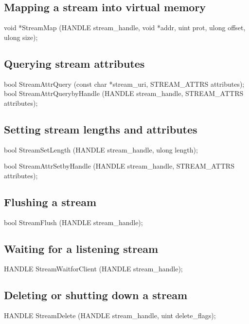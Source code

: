 \subsection*{Mapping a stream into virtual memory}

\begin{paldef}
void *StreamMap (HANDLE stream_handle, void *addr,
                 uint prot, ulong offset, ulong size);
\end{paldef}



\subsection*{Querying stream attributes}

\begin{paldef}
bool StreamAttrQuery (const char *stream_uri,
                      STREAM_ATTRS attributes);
bool StreamAttrQuerybyHandle (HANDLE stream_handle,
                              STREAM_ATTRS attributes);
\end{paldef}



\subsection*{Setting stream lengths and attributes}


\begin{paldef}
bool StreamSetLength (HANDLE stream_handle,
                      ulong length);
\end{paldef}


\begin{paldef}
bool StreamAttrSetbyHandle (HANDLE stream_handle,
                            STREAM_ATTRS attributes);
\end{paldef}




\subsection*{Flushing a stream}


\begin{paldef}
bool StreamFlush (HANDLE stream_handle);
\end{paldef}


\subsection*{Waiting for a listening stream}


\begin{paldef}
HANDLE StreamWaitforClient (HANDLE stream_handle);
\end{paldef} 


\subsection*{Deleting or shutting down a stream}


\begin{paldef}
HANDLE StreamDelete (HANDLE stream_handle,
                     uint delete_flags);
\end{paldef}